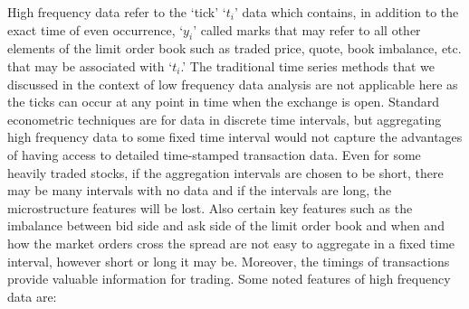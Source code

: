 High frequency data refer to the `tick' `$t_i$' data which contains, in addition to the exact time of even occurrence, `$y_i$' called marks that may refer to all other elements of the limit order book such as traded price, quote, book imbalance, etc. that may be associated with `$t_i$.' The traditional time series methods that we discussed in the context of low frequency data analysis are not applicable here as the ticks can occur at any point in time when the exchange is open. Standard econometric techniques are for data in discrete time intervals, but aggregating\label{in:agg} high frequency data to some fixed time interval would not capture the advantages of having access to detailed time-stamped transaction data. Even for some heavily traded stocks, if the aggregation intervals are chosen to be short, there may be many intervals with no data and if the intervals are long, the microstructure features will be lost. Also certain key features such as the imbalance between bid side and ask side of the limit order book and when and how the market orders cross the spread are not easy to aggregate in a fixed time interval, however short or long it may be. Moreover, the timings of transactions provide valuable information for trading. Some noted features of high frequency data are:


